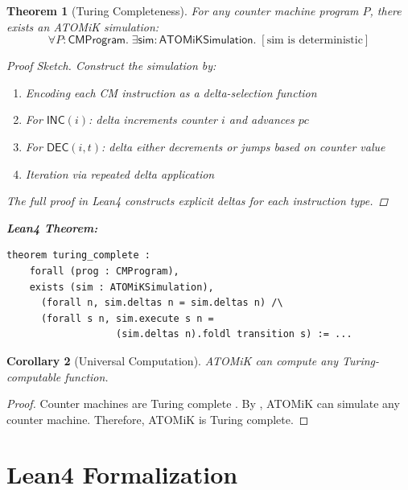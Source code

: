 \documentclass[11pt,letterpaper]{article}
\theoremstyle{plain}
\newtheorem{theorem}{Theorem}[section]
\newtheorem{corollary}[theorem]{Corollary}
\theoremstyle{definition}
\theoremstyle{remark}
\begin{document}
\begin{theorem}[Turing Completeness]
\label{thm:turing}
For any counter machine program $P$, there exists an ATOMiK simulation:
\[
\forall P : \mathsf{CMProgram}.\; \exists \mathsf{sim} : \mathsf{ATOMiKSimulation}.\; [\text{sim is deterministic}]
\]

\begin{proof}[Proof Sketch]
Construct the simulation by:
\begin{enumerate}
    \item Encoding each CM instruction as a delta-selection function
    \item For $\mathsf{INC}(i)$: delta increments counter $i$ and advances $\mathit{pc}$
    \item For $\mathsf{DEC}(i, t)$: delta either decrements or jumps based on counter value
    \item Iteration via repeated delta application
\end{enumerate}
The full proof in Lean4 constructs explicit deltas for each instruction type.
\end{proof}

\medskip
\noindent\textbf{Lean4 Theorem:}
\begin{lstlisting}
theorem turing_complete :
    forall (prog : CMProgram),
    exists (sim : ATOMiKSimulation),
      (forall n, sim.deltas n = sim.deltas n) /\
      (forall s n, sim.execute s n = 
                   (sim.deltas n).foldl transition s) := ...
\end{lstlisting}
\end{theorem}

\begin{corollary}[Universal Computation]
\label{cor:universal}
ATOMiK can compute any Turing-computable function.
\end{corollary}

\begin{proof}
Counter machines are Turing complete \cite{minsky1967computation}. By , ATOMiK can simulate any counter machine. Therefore, ATOMiK is Turing complete.
\end{proof}

\section{Lean4 Formalization}
\label{sec:verification}
\end{document}
